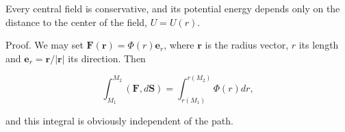 Every central field is conservative, and its potential energy depends only on the distance to the center of the field, $U = U(r)$.

Proof. We may set $\mathbf{F}(\mathbf{r}) = \Phi(r)\mathbf{e}_r$, where $\mathbf{r}$ is the radius vector, $r$ its length and $\mathbf{e}_r = \mathbf{r}/|\mathbf{r}|$ its direction. Then

$$\int_{M_1}^{M_2} (\mathbf{F}, d\mathbf{S}) = \int_{r(M_1)}^{r(M_2)} \Phi(r)dr,$$

and this integral is obviously independent of the path.
